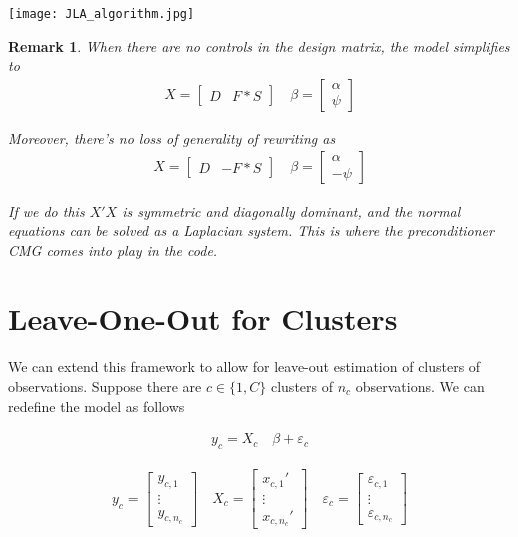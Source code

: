 \documentclass[12pt]{article}
\newtheorem{remark}{Remark}
\begin{document}
\texttt{[image: JLA\_algorithm.jpg]}

\begin{remark}
When there are no controls in the design matrix, the model simplifies to
\begin{align*}
    X = \begin{bmatrix} D & F*S \end{bmatrix} \quad \beta = \begin{bmatrix} \alpha \\ \psi \end{bmatrix} 
\end{align*}

\noindent Moreover, there's no loss of generality of rewriting as
\begin{align*}
    X = \begin{bmatrix} D & -F*S \end{bmatrix} \quad \beta = \begin{bmatrix} \alpha \\ -\psi \end{bmatrix} 
\end{align*}

\noindent If we do this $X'X$ is symmetric and diagonally dominant, and the normal equations can be solved as a Laplacian system. This is where the preconditioner \textit{CMG} comes into play in the code.


\end{remark}


\section{Leave-One-Out for Clusters}

We can extend this framework to allow for leave-out estimation of clusters of observations. Suppose there are $c\in \{1,C\}$ clusters of $n_c$ observations. We can redefine the model as follows

\begin{align*}
    y_c = X_c \quad \beta + \varepsilon_c 
\end{align*}

\begin{align*}
    y_c = \begin{bmatrix} y_{c,1} \\ \vdots \\ y_{c,n_c}  \end{bmatrix} \quad X_c = \begin{bmatrix} x_{c,1}' \\ \vdots \\ x_{c,n_c}'  \end{bmatrix} \quad \varepsilon_c = \begin{bmatrix} \varepsilon_{c,1} \\ \vdots \\ \varepsilon_{c,n_c}  \end{bmatrix} 
\end{align*}
\end{document}
